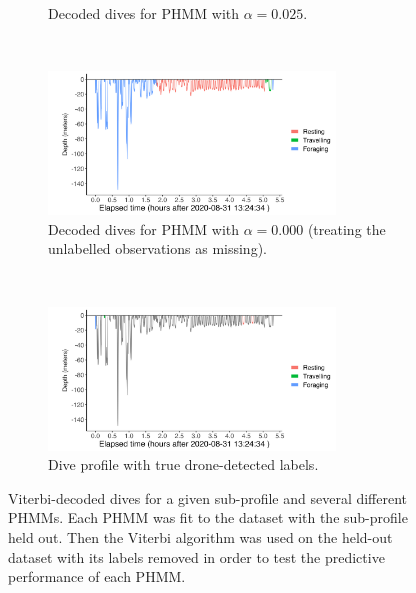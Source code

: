 \begin{figure}[H]
\begin{subfigure}[t]{0.45\textwidth}
        \caption{Decoded dives for PHMM with $\alpha = 0.025$.}
    \end{subfigure}
    \\
    \begin{subfigure}[t]{0.45\textwidth}
        \centering
        \includegraphics[width = 3in]{plt/D26b-profile-D26b-fixed-0.png}
        \caption{Decoded dives for PHMM with $\alpha = 0.000$ (treating the unlabelled observations as missing).}
    \end{subfigure}
    ~
    \begin{subfigure}[t]{0.45\textwidth}
        \centering
        \includegraphics[width = 3in]{plt/D26b-profile-D26b-known_states.png}
        \caption{Dive profile with true drone-detected labels.}
    \end{subfigure}
    \caption{Viterbi-decoded dives for a given sub-profile and several different PHMMs. Each PHMM was fit to the dataset with the sub-profile held out. Then the Viterbi algorithm was used on the held-out dataset with its labels removed in order to test the predictive performance of each PHMM.}
    \label{fig:viterbi_dives_D26b_app}
\end{figure}